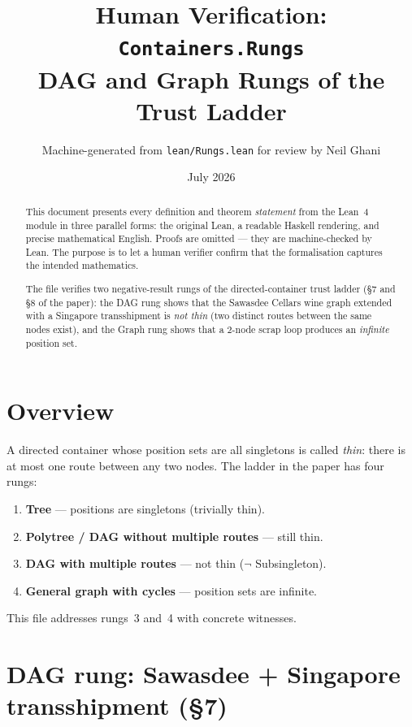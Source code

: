 \documentclass[11pt,a4paper]{article}
\title{Human Verification: \texttt{Containers.Rungs}\\[4pt]
  \large DAG and Graph Rungs of the Trust Ladder}
\author{Machine-generated from \texttt{lean/Rungs.lean} for review by Neil Ghani}
\date{July 2026}
\begin{document}
\maketitle

\begin{abstract}
This document presents every definition and theorem \emph{statement} from the
Lean~4 module  in three parallel forms: the original
Lean, a readable Haskell rendering, and precise mathematical English.  Proofs
are omitted --- they are machine-checked by Lean.  The purpose is to let a
human verifier confirm that the formalisation captures the intended
mathematics.

The file verifies two negative-result rungs of the directed-container trust
ladder (\S7 and \S8 of the paper): the DAG rung shows that the Sawasdee
Cellars wine graph extended with a Singapore transshipment is \emph{not thin}
(two distinct routes between the same nodes exist), and the Graph rung shows
that a 2-node scrap loop produces an \emph{infinite} position set.
\end{abstract}

\tableofcontents
\bigskip

\section{Overview}

A directed container whose position sets are all singletons is called
\emph{thin}: there is at most one route between any two nodes.  The ladder in
the paper has four rungs:

\begin{enumerate}
  \item \textbf{Tree} --- positions are singletons (trivially thin).
  \item \textbf{Polytree / DAG without multiple routes} --- still thin.
  \item \textbf{DAG with multiple routes} --- not thin ($\lnot$ Subsingleton).
  \item \textbf{General graph with cycles} --- position sets are infinite.
\end{enumerate}

This file addresses rungs~3 and~4 with concrete witnesses.

\section{DAG rung: Sawasdee + Singapore transshipment (\S7)}
\end{document}
